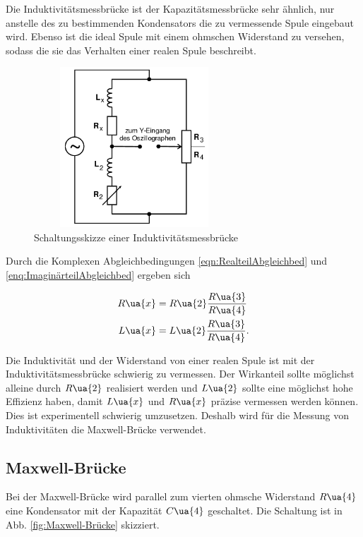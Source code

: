 Die Induktivitätsmessbrücke ist der Kapazitätsmessbrücke sehr ähnlich, nur anstelle
des zu bestimmenden Kondensators die zu vermessende Spule eingebaut wird.
Ebenso ist die ideal Spule mit einem ohmschen Widerstand zu versehen, sodass
die sie das Verhalten einer realen Spule beschreibt.
\begin{figure}
  \includegraphics[width=7.50cm, height=6cm]{V302_Induktivitätsmessbrücke}
  \caption{Schaltungsskizze einer Induktivitätsmessbrücke\cite{anleitung01}}
  \label{fig:Induktivitätsmessbrücke}
\end{figure}

Durch die Komplexen Abgleichbedingungen \eqref{eqn:RealteilAbgleichbed} und
\eqref{enq:ImaginärteilAbgleichbed} ergeben sich

\begin{align}
  R\ua{x} &= R\ua{2}\frac{R\ua{3}}{R\ua{4}}\label{InduktivitätmessbrückeRx}\\
  L\ua{x} &= L\ua{2}\frac{R\ua{3}}{R\ua{4}}.\label{InduktivitätmessbrückeLx}
\end{align}

Die Induktivität und der Widerstand von einer realen Spule ist mit der
Induktivitätsmessbrücke schwierig zu vermessen. Der Wirkanteil sollte
möglichst alleine durch $R\ua{2}$ realisiert werden und $L\ua{2}$ sollte
eine möglichst hohe Effizienz haben, damit $L\ua{x}$ und $R\ua{x}$ präzise vermessen
werden können. Dies ist experimentell schwierig umzusetzen.
Deshalb wird für die Messung von Induktivitäten die Maxwell-Brücke verwendet.

\subsection{Maxwell-Brücke}

Bei der Maxwell-Brücke wird parallel zum vierten ohmsche Widerstand $R\ua{4}$
eine Kondensator mit der Kapazität $C\ua{4}$ geschaltet. Die Schaltung ist in
Abb. \ref{fig:Maxwell-Brücke} skizziert.

